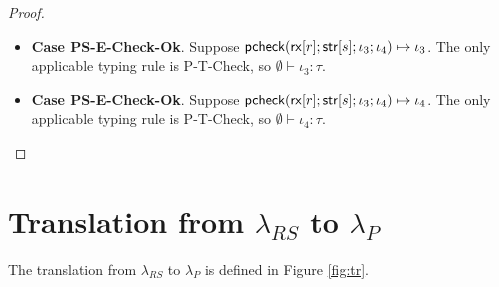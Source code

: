 \documentclass[11pt,leqno]{article}
\theoremstyle{definition}
\newcommand{\lambdas}{\lambda_{RS}}
\newcommand{\lambdap}{\lambda_P}
\newcommand{\tcheck}[4]{{\sf pcheck}(#1; #2; #3; #4)}
\renewcommand{\tstr}[1]{{{\sf str}[#1]}}
\newcommand{\rx}[1]{ {\sf rx}[#1] }
\begin{document}
\begin{proof}
\begin{itemize}[label=$ $,itemsep=1ex]
\item \textbf{Case PS-E-Check-Ok}.
Suppose $\tcheck{\rx{r}}{\tstr{s}}{\iota_3}{\iota_4} \mapsto \iota_3$. 
The only applicable typing rule is P-T-Check, so $\emptyset \vdash \iota_3 : \tau$.

\item \textbf{Case PS-E-Check-Ok}.
Suppose $\tcheck{\rx{r}}{\tstr{s}}{\iota_3}{\iota_4} \mapsto \iota_4$. 
The only applicable typing rule is P-T-Check, so $\emptyset \vdash \iota_4 : \tau$.

\end{itemize}



\end{proof}



\section{Translation from $\lambdas$ to $\lambdap$}
The translation from $\lambdas$ to $\lambdap$ is defined in Figure \ref{fig:tr}.
\end{document}
